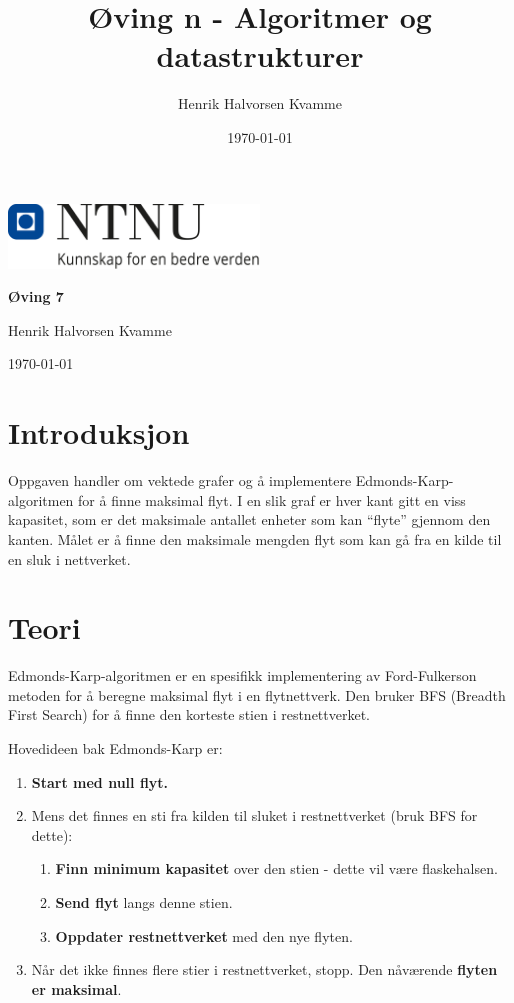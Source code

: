 \documentclass[12pt,a4paper]{article}
\title{Øving n - Algoritmer og datastrukturer}
\author{Henrik Halvorsen Kvamme}
\date{\today}
\begin{document}
\begin{center}
    \includegraphics[width=0.5\textwidth]{../images/NTNU_Logo.png}
    
    \vspace{1.5em}  %
    
    {\LARGE \textbf{Øving 7} \\[0.5em] }  %
    \vspace{1em}  %
    
    {\large Henrik Halvorsen Kvamme}\\  %
    \vspace{0.5em}  %
    
    {\today}  %
\end{center}

\vspace{2em}

\tableofcontents

\newpage

\section{Introduksjon}
Oppgaven handler om vektede grafer og å implementere Edmonds-Karp-algoritmen for å finne maksimal flyt. I en slik graf er hver kant gitt en viss kapasitet, som er det maksimale antallet enheter som kan ``flyte'' gjennom den kanten. Målet er å finne den maksimale mengden flyt som kan gå fra en kilde til en sluk i nettverket.

\section{Teori}
Edmonds-Karp-algoritmen er en spesifikk implementering av Ford-Fulkerson metoden for å beregne maksimal flyt i en flytnettverk.
Den bruker BFS (Breadth First Search) for å finne den korteste stien i restnettverket.

Hovedideen bak Edmonds-Karp er:
\begin{enumerate}
    \item \textbf{Start med null flyt.}
    \item Mens det finnes en sti fra kilden til slu\-ket i restnettverket (bruk BFS for dette):
    \begin{enumerate}[label=\alph*)]
        \item \textbf{Finn minimum kapasitet} over den stien - dette vil være flaskehalsen.
        \item \textbf{Send flyt} langs denne stien.
        \item \textbf{Oppdater restnettverket} med den nye flyten.
    \end{enumerate}
    \item Når det ikke finnes flere stier i restnettverket, stopp. Den nåværende \textbf{flyten er maksimal}.
\end{enumerate}
\end{document}
